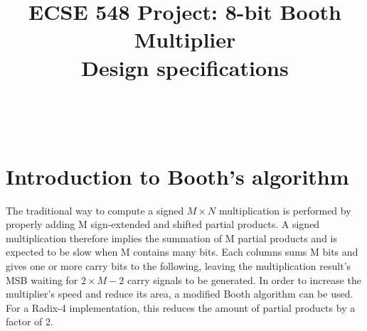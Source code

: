\documentclass[conference]{IEEEtran}
\begin{document}
%
\title{ECSE 548 Project: 8-bit Booth Multiplier\\Design specifications}

\author{
~\\~\\
}







\maketitle







%
\IEEEpeerreviewmaketitle

\section{Introduction to Booth's algorithm}
The traditional way to compute a signed $M\times N$ multiplication is performed by properly
adding M sign-extended and shifted partial products. A signed multiplication therefore implies
the summation of M partial products and is expected to be slow when M contains many bits.
Each columns sums M bits and gives one or more carry bits to the following, leaving the
multiplication result's MSB waiting for $2\times M-2$ carry signals to be generated. In order to increase
the multiplier's speed and reduce its area, a modified Booth algorithm can be used. For a Radix-4 implementation, this reduces the amount of partial products by a factor of 2.
\end{document}
